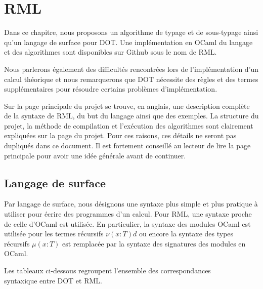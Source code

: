 \chapter{RML}
\label{chapter:rml}

Dans ce chapitre, nous proposons un algorithme de typage et de sous-typage ainsi
qu'un langage de surface pour DOT. Une implémentation en OCaml du langage et des
algorithmes sont disponibles sur Github\cite{rml-github} sous le nom de RML.

Nous parlerons également des difficultés rencontrées lors de l'implémentation
d'un calcul théorique et nous remarquerons que DOT nécessite des règles et des termes
supplémentaires pour résoudre certains problèmes d'implémentation.


Sur la page principale du projet se trouve, en anglais, une description complète de la syntaxe de RML,
du but du langage ainsi que des exemples.
La structure du projet, la méthode de compilation et l'exécution des
algorithmes sont clairement expliquées sur la page du projet. Pour ces raisons,
ces détails ne seront pas dupliqués dans ce document.
Il est fortement conseillé au lecteur de lire la page principale pour avoir une
idée générale avant de continuer.

\section{Langage de surface}

Par langage de surface, nous désignons une syntaxe plus simple et plus pratique
à utiliser pour écrire des programmes d'un calcul. Pour RML, une syntaxe proche
de celle d'OCaml est utilisée. En particulier, la syntaxe des modules OCaml est utilisée pour les
termes récursifs $\nu(x : T)d$ ou encore la syntaxe des types récursifs $\mu(x :
T)$ est remplacée par la syntaxe des signatures des modules en OCaml.

Les tableaux ci-dessous regroupent l'ensemble des correspondances \\ syntaxique entre DOT et
RML.

